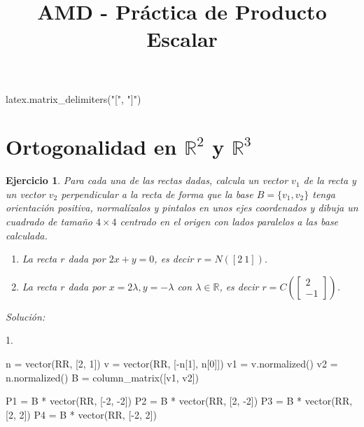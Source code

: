 \documentclass{amsart}
\title{AMD - Práctica de Producto Escalar}
\newtheorem{ejer}{Ejercicio}
\begin{document}
\maketitle

\begin{sagecode}
latex.matrix_delimiters("[", "]")
\end{sagecode}

\section{Ortogonalidad en ${\mathbb R}^2$ y ${\mathbb R}^3$}

\begin{ejer}
Para cada una de las rectas dadas, calcula un vector $v_1$ de la recta y un vector $v_2$ perpendicular
a la recta de forma que la base $B = \{v_1,v_2\}$ tenga orientación positiva, normalízalos y pintalos 
en unos ejes coordenados y dibuja un cuadrado de tamaño $4\times 4$ centrado en el origen con lados 
paralelos a las base calculada.

\begin{enumerate}
\item La recta $r$ dada por $2x+y = 0$, es decir $r = N([2\ 1])$.
\item La recta $r$ dada por $x = 2\lambda, y = -\lambda$ con $\lambda \in {\mathbb R}$, es decir
$r = C\left(\left[\begin{array}{c} 2 \\ -1 \end{array} \right]\right)$.
\end{enumerate}

\end{ejer}

{\it Solución:}


1.

\begin{sageblock}
n = vector(RR, [2, 1])
v = vector(RR, [-n[1], n[0]])
v1 = v.normalized()
v2 = n.normalized()
B = column_matrix([v1, v2])

P1 = B * vector(RR, [-2, -2])
P2 = B * vector(RR, [2, -2])
P3 = B * vector(RR, [2, 2])
P4 = B * vector(RR, [-2, 2])
\end{sageblock}

\begin{sagesub}
\begin{center}
\end{center}
\end{sagesub}
\end{document}
